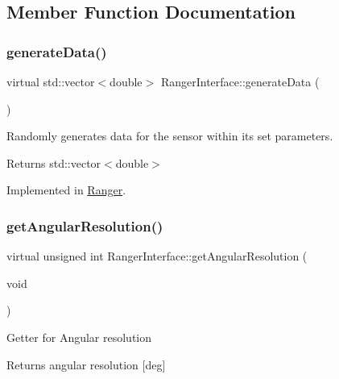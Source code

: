 \subsection{Member Function Documentation}
\mbox{\label{classRangerInterface_a969c670cadf55a15733809116dc305c8}} 
\subsubsection{\texorpdfstring{generate\+Data()}{generateData()}}
{\footnotesize\ttfamily virtual std\+::vector$<$double$>$ Ranger\+Interface\+::generate\+Data (\begin{DoxyParamCaption}{ }\end{DoxyParamCaption})\hspace{0.3cm}{\ttfamily [pure virtual]}}



Randomly generates data for the sensor within its set parameters. 

\begin{DoxyReturn}{Returns}
std\+::vector$<$double$>$ 
\end{DoxyReturn}


Implemented in \hyperlink{classRanger_a2b76dc3e21da8a7abac830d09fa81241}{Ranger}.

\mbox{\label{classRangerInterface_a37d4f89daffa8b2708dfc11034893552}} 
\subsubsection{\texorpdfstring{get\+Angular\+Resolution()}{getAngularResolution()}}
{\footnotesize\ttfamily virtual unsigned int Ranger\+Interface\+::get\+Angular\+Resolution (\begin{DoxyParamCaption}\item[{void}]{ }\end{DoxyParamCaption})\hspace{0.3cm}{\ttfamily [pure virtual]}}

Getter for Angular resolution \begin{DoxyReturn}{Returns}
angular resolution \mbox{[}deg\mbox{]} 
\end{DoxyReturn}


